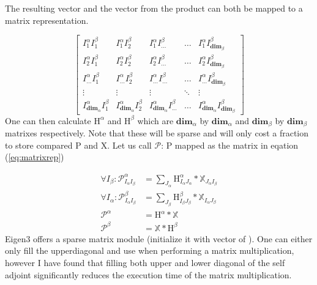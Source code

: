 The resulting vector and the vector from the product can both be mapped to a matrix representation.

\begin{equation}
\begin{bmatrix} \label{eq:matrixrep}
    I^{\alpha}_1 I^{\beta}_1 & I^{\alpha}_1 I^{\beta}_2  & I^{\alpha}_1 I^{\beta}_{...} & \dots  & I^{\alpha}_1 I^{\beta}_{\textbf{dim}_\beta} \\
    I^{\alpha}_2 I^{\beta}_1 & I^{\alpha}_2 I^{\beta}_2  & I^{\alpha}_2 I^{\beta}_{...} & \dots  & I^{\alpha}_2 I^{\beta}_{\textbf{dim}_\beta} \\
    I^{\alpha}_{...} I^{\beta}_1 & I^{\alpha}_{...} I^{\beta}_2  & I^{\alpha}_{...} I^{\beta}_{...} & \dots  & I^{\alpha}_{...} I^{\beta}_{\textbf{dim}_\beta} \\
    \vdots & \vdots & \vdots & \ddots & \vdots \\
    I^{\alpha}_{\textbf{dim}_\alpha} I^{\beta}_1 & I^{\alpha}_{\textbf{dim}_\alpha} I^{\beta}_2  & I^{\alpha}_{\textbf{dim}_\alpha} I^{\beta}_{...} & \dots  &
    I^{\alpha}_{\textbf{dim}_\alpha} I^{\beta}_{\textbf{dim}_\beta}
\end{bmatrix}
\end{equation}
One can then calculate $\text{H}^{\alpha}$ and $\text{H}^{\beta}$ which are $\textbf{dim}_\alpha$ by $\textbf{dim}_\alpha$ and $\textbf{dim}_\beta$ by $\textbf{dim}_\beta$
matrixes respectively. Note that these will be sparse and will only cost a fraction to store compared P and X.
Let us call $\mathcal{P}$: P mapped as the matrix in eqation (\ref{eq:matrixrep})

\begin{align}
    \forall I_\beta: \mathcal{P}^{\alpha}_{I_\alpha I_\beta} & = \sum_{J_\alpha} \text{H}^{\alpha}_{I_\alpha J_\alpha} * \mathbb{X}_{J_\alpha I_\beta} \\
    \forall I_\alpha: \mathcal{P}^{\beta}_{I_\alpha  I_\beta} & = \sum_{J_\beta} \text{H}^{\beta}_{I_\beta J_\beta} * \mathbb{X}_{I_\alpha J_\beta} \\
   \mathcal{P}^\alpha & = \text{H}^{\alpha} * \mathbb{X} \\
  \mathcal{P}^\beta & = \mathbb{X} * \text{H}^{\beta}
\end{align}
Eigen3 offers a sparse matrix module (initialize it with vector of ). One can either only fill the upperdiagonal and use 
when performing a matrix multiplication, however I have found that filling both upper and lower diagonal of the self adjoint  significantly reduces the execution time of the matrix multiplication.

